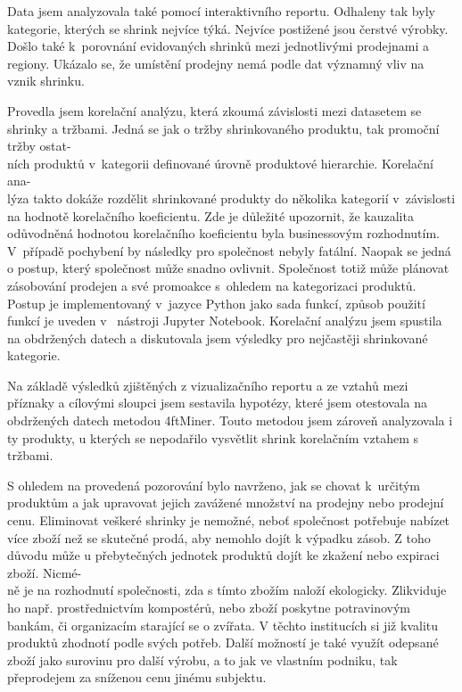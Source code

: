 Data jsem analyzovala také pomocí interaktivního reportu. Odhaleny tak byly kategorie, kterých se shrink nejvíce týká. Nejvíce postižené jsou čerstvé výrobky. Došlo také k~porovnání evidovaných shrinků mezi jednotlivými prodejnami a regiony. Ukázalo se, že umístění prodejny nemá podle dat významný vliv na vznik shrinku. 


Provedla jsem korelační analýzu, která zkoumá závislosti mezi datasetem se shrinky a tržbami. Jedná se jak o tržby shrinkovaného produktu, tak promoční tržby ostat-\\ních produktů v~kategorii definované úrovně produktové hierarchie. Korelační ana-\\lýza takto dokáže rozdělit shrinkované produkty do několika kategorií v~závislosti na hodnotě korelačního koeficientu. Zde je důležité upozornit, že kauzalita odůvodněná hodnotou korelačního koeficientu byla businessovým rozhodnutím. V~případě pochybení by následky pro společnost nebyly fatální. Naopak se jedná o postup, který společnost může snadno ovlivnit. Společnost totiž může plánovat zásobování prodejen a své promoakce s~ohledem na kategorizaci produktů.
Postup je implementovaný v~jazyce Python jako sada funkcí, způsob použití funkcí je uveden v~ nástroji Jupyter Notebook. 
Korelační analýzu jsem spustila na obdržených datech a diskutovala jsem výsledky pro nejčastěji shrinkované kategorie.

Na základě výsledků zjištěných z vizualizačního reportu a ze vztahů mezi příznaky a cílovými sloupci jsem sestavila hypotézy, které jsem otestovala na obdržených datech metodou 4ftMiner. Touto metodou jsem zároveň analyzovala i ty produkty, u kterých se nepodařilo vysvětlit shrink korelačním vztahem s tržbami.

S ohledem  na provedená pozorování bylo navrženo, jak se chovat k~určitým produktům a jak upravovat jejich zavážené množství na prodejny nebo prodejní cenu. Eliminovat veškeré shrinky je nemožné, neboť společnost potřebuje nabízet více zboží než se skutečné prodá, aby nemohlo dojít k výpadku zásob. Z toho důvodu může u přebytečných jednotek produktů dojít ke zkažení nebo expiraci zboží. Nicmé-\\ně je na rozhodnutí společnosti, zda s tímto zbožím naloží ekologicky. Zlikviduje ho např. prostřednictvím kompostérů, nebo zboží poskytne potravinovým bankám, či organizacím starající se o zvířata. V těchto institucích si již kvalitu produktů zhodnotí podle svých potřeb. Další možností je také využít odepsané zboží jako surovinu pro další výrobu, a to jak ve vlastním podniku, tak přeprodejem za sníženou cenu jinému subjektu.

